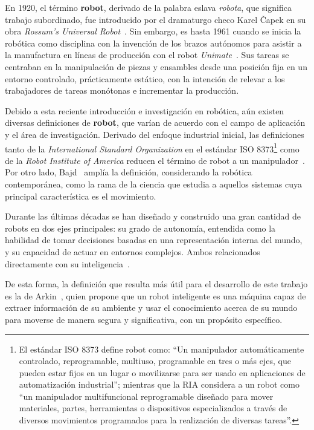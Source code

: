 En 1920, el término \textbf{robot}, derivado de la palabra eslava \emph{robota}, que significa trabajo subordinado, fue introducido por el dramaturgo checo Karel Čapek en su obra \emph{Rossum's Universal Robot}~\cite{robotics_handbook}. Sin embargo, es hasta 1961 cuando se inicia la robótica como disciplina con la invención de los brazos autónomos para asistir a la manufactura en líneas de producción con el robot \emph{Unimate}~\cite{yazmin_intro}. Sus tareas se centraban en la manipulación de piezas y ensambles desde una posición fija en un entorno controlado, prácticamente estático, con la intención de relevar a los trabajadores de tareas monótonas e incrementar la producción.

Debido a esta reciente introducción e investigación en robótica, aún existen diversas definiciones de \textbf{robot}, que varían de acuerdo con el campo de aplicación y el área de investigación. Derivado del enfoque industrial inicial, las definiciones tanto de la \emph{International Standard Organization} en el estándar ISO 8373\footnote{El estándar ISO 8373 define robot como: ``Un manipulador automáticamente controlado, reprogramable, multiuso, programable en tres o más ejes, que pueden estar fijos en un lugar o movilizarse para ser usado en aplicaciones de automatización industrial''; mientras que la  RIA considera a un robot como ``un manipulador multifuncional reprogramable diseñado para mover materiales, partes, herramientas o dispositivos especializados a través de diversos movimientos programados para la realización de diversas tareas''.} como de la \emph{Robot Institute of America} reducen el término de robot a un manipulador~\cite{yazmin_robotsServicio}. Por otro lado, Bajd~\cite{bajd_introRobotics} amplía la definición, considerando la robótica contemporánea, como la rama de la ciencia que estudia a aquellos sistemas cuya principal característica es el movimiento.

Durante las últimas décadas se han diseñado y construido una gran cantidad de robots en dos ejes principales: su grado de autonomía, entendida como la habilidad de tomar decisiones basadas en una representación interna del mundo, y su capacidad de actuar en entornos complejos. Ambos relacionados directamente con su inteligencia~\cite{yazmin_intro}.

\hypertarget{arkin}{De esta forma, la definición que resulta más útil para el desarrollo de este trabajo es la de Arkin~\cite{arkin}, quien propone que un robot inteligente es una máquina capaz de extraer información de su ambiente y usar el conocimiento acerca de su mundo para moverse de manera segura y significativa, con un propósito específico.}

